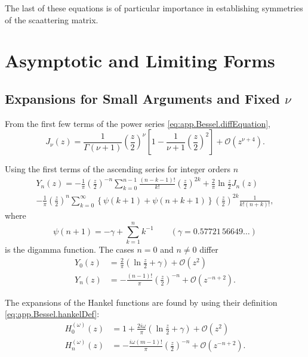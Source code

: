 The last of these equations is of particular importance in establishing
symmetries of the scaattering matrix.

\section{Asymptotic and Limiting Forms}
\subsection{Expansions for Small Arguments and Fixed $\nu$}\label{sec:app.Bessel.smallArguments}
From the first few terms of the power series \eqref{eq:app.Bessel.diffEquation}, 
  \begin{equation}
    J_\nu(z) = \frac{1}{\Gamma(\nu+1)}\left(\frac{z}{2}\right)^\nu\left[1-\frac{1}{\nu+1}\left(\frac{z}{2}\right)^2\right]+\mathcal{O}(z^{\nu+4}).
  \end{equation}
  
Using the first terms of the ascending series for integer orders $n$ \cite[\S9.1.11]{ABR1965}
  \begin{multline}
   Y_n(z)=-\frac{1}{\pi}\left(\frac{z}{2}\right)^{-n}\sum_{k=0}^{n-1}\frac{(n-k-1)!}{k!}\left(\frac{z}{2}\right)^{2k}
      +\frac{2}{\pi}\ln\frac{z}{2}J_n(z)
      \\-\frac{1}{\pi}\left(\frac{z}{2}\right)^n\sum_{k=0}^\infty\left\{\psi(k+1)+\psi(n+k+1)\right\}\left(\frac{z}{2}\right)^{2k}\frac{1}{k!(n+k)!},
  \end{multline}
where 
  \begin{equation}
   \psi(n+1) = -\gamma +\sum_{k=1}^nk^{-1}\qquad(\gamma=0.57721\,56649\ldots)
  \end{equation}
is the digamma function. The cases $n=0$ and $n\neq0$ differ
  \begin{align}
   Y_0(z)	&= \frac{2}{\pi}\left(\ln\frac{z}{2}+\gamma\right)+\mathcal{O}(z^2)	\\
   Y_n(z)	&= -\frac{(n-1)!}{\pi}\left(\frac{z}{2}\right)^{-n} +\mathcal{O}(z^{-n+2}).
  \end{align}

The expansions of the Hankel functions are found by using 
their definition \eqref{eq:app.Bessel.hankelDef}:
  \begin{align}
   H_0^{(\omega)}(z)	&=1+\frac{2i\omega}{\pi}\left(\ln\frac{z}{2}+\gamma\right)+\mathcal{O}(z^2)	\\
   H_n^{(\omega)}(z)	&=-\frac{i\omega(m-1)!}{\pi}\left(\frac{z}{2}\right)^{-n}+\mathcal{O}(z^{-n+2}).
  \end{align}

